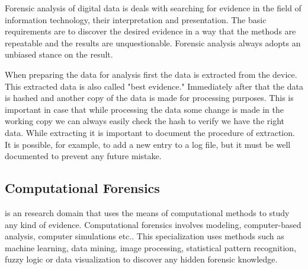 
Forensic analysis of digital data is deals with searching for evidence in the field of information technology, their interpretation and presentation. The basic requirements are to discover the desired evidence in a way that the methods are repeatable and the results are unquestionable. Forensic analysis always adopts an unbiased stance on the result.

When preparing the data for analysis first the data is extracted from the device. This extracted data is also called "best evidence." Immediately after that the data is hashed and another copy of the data is made for processing purposes. This is important in case that while processing the data some change is made in the working copy we can always easily check the hash to verify we have the right data. While extracting it is important to document the procedure of extraction. It is possible, for example, to add a new entry to a log file, but it must be well documented to prevent any future mistake.


%
%
%
%
%
%
% 	

\subsection{Computational Forensics} is an research domain that uses the means of computational methods to study any kind of evidence. Computational forensics involves modeling, computer-based analysis, computer simulations etc.. This specialization uses methods such as machine learning, data mining, image processing, statistical pattern recognition, fuzzy logic or data visualization to discover any hidden forensic knowledge. 



